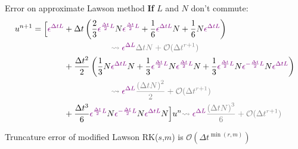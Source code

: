 \documentclass{beamer}
\newcommand{\mbold}[1]{{\textbf{\color{PLB}#1}}}
\begin{document}
\begin{frame}{Error on approximate Lawson method}
  \mbold{If} $L$ and $N$ don't commute:
  $$
    \begin{aligned}
      u^{n+1} = \Big[ \pexp{\Delta tL}
        &+\Delta t\left(\frac{2}{3}\pexp{\frac{\Delta t}{2}L}N\pexp{\frac{\Delta t}{2}L}+\frac{1}{6}\pexp{\Delta tL}N + \frac{1}{6}N\pexp{\Delta tL}\right)\\
          &\hspace{2cm} \textcolor{gris}{\rightsquigarrow \pexp{\Delta L}\Delta t N + \mathcal{O}(\Delta t^{r+1})} \\
        & + \frac{\Delta t^2}{2}\left(\frac{1}{3}N\pexp{\Delta tL}N + \frac{1}{3}\pexp{\frac{\Delta t}{2}L}N\pexp{\frac{\Delta t}{2}L}N + \frac{1}{3} \pexp{\frac{\Delta t}{2}L}N\pexp{-\frac{\Delta t}{2}L}N\pexp{\Delta tL} \right) \\
          &\hspace{2cm} \textcolor{gris}{\rightsquigarrow \pexp{\Delta L}\frac{\left(\Delta t N\right)^2}{2} + \mathcal{O}(\Delta t^{r+1})} \\
      & + \frac{\Delta t^3}{6}\pexp{\frac{\Delta t}{2}L}N\pexp{-\frac{\Delta t}{2}L}N\pexp{\Delta tL}N \Big]u^n \textcolor{gris}{\rightsquigarrow \pexp{\Delta L}\frac{\left(\Delta t N\right)^3}{6} + \mathcal{O}(\Delta t^{r+1})}
    \end{aligned}
  $$

  \begin{lemma}
    Truncature error of modified Lawson RK($s$,$m$) is $\mathcal{O}(\Delta t^{\min(r,m)})$
  \end{lemma}
\end{frame}
\end{document}
